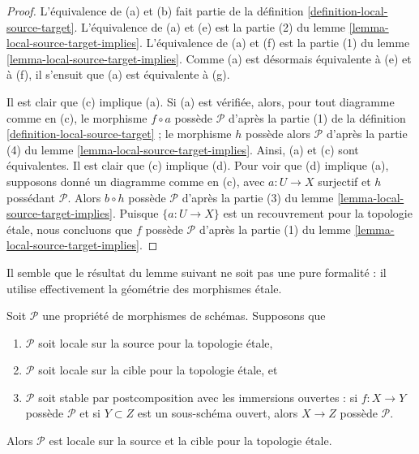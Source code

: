 \begin{proof}
L'équivalence de (a) et (b) fait partie de la
définition \ref{definition-local-source-target}.
L'équivalence de (a) et (e) est la partie (2) du
lemme \ref{lemma-local-source-target-implies}.
L'équivalence de (a) et (f) est la partie (1) du
lemme \ref{lemma-local-source-target-implies}.
Comme (a) est désormais équivalente à (e) et à (f), il s'ensuit que (a) est
équivalente à (g).

\medskip\noindent
Il est clair que (c) implique (a). Si (a) est vérifiée, alors, pour tout
diagramme comme en (c), le morphisme $f \circ a$ possède $\mathcal{P}$ d'après
la partie (1) de la définition \ref{definition-local-source-target} ; le
morphisme $h$ possède alors $\mathcal{P}$ d'après la partie (4) du
lemme \ref{lemma-local-source-target-implies}.
Ainsi, (a) et (c) sont équivalentes. Il est clair que (c) implique (d).
Pour voir que (d) implique (a), supposons donné un diagramme comme en (c),
avec $a : U \to X$ surjectif et $h$ possédant $\mathcal{P}$.
Alors $b \circ h$ possède $\mathcal{P}$ d'après la partie (3) du
lemme \ref{lemma-local-source-target-implies}.
Puisque $\{a : U \to X\}$ est un recouvrement pour la topologie \'etale,
nous concluons que
$f$ possède $\mathcal{P}$ d'après la partie (1) du
lemme \ref{lemma-local-source-target-implies}.
\end{proof}

\noindent
Il semble que le résultat du lemme suivant ne soit pas une pure formalité :
il utilise effectivement la géométrie des morphismes \'etale.

\begin{lemma}
\label{lemma-etale-local-source-target}
Soit $\mathcal{P}$ une propriété de morphismes de schémas. Supposons que
\begin{enumerate}
\item $\mathcal{P}$ soit locale sur la source pour la topologie \'etale,
\item $\mathcal{P}$ soit locale sur la cible pour la topologie \'etale, et
\item $\mathcal{P}$ soit stable par postcomposition avec les immersions
ouvertes : si $f : X \to Y$ possède $\mathcal{P}$ et si $Y \subset Z$ est un
sous-schéma ouvert, alors $X \to Z$ possède $\mathcal{P}$.
\end{enumerate}
Alors $\mathcal{P}$ est locale sur la source et la cible pour la topologie
\'etale.
\end{lemma}

